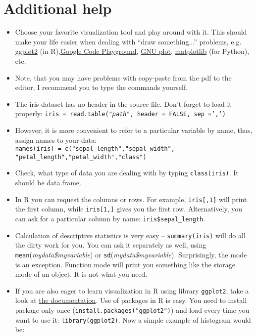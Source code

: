 \documentclass{article}
\begin{document}
\section*{Additional help}
\begin{itemize}
\item Choose your favorite visualization tool and play around with it. This should make your life easier when dealing with ``draw something...'' problems, e.g. \href{http://docs.ggplot2.org/current/}{ggplot2} (in R),\href{https://code.google.com/apis/ajax/playground/?type=visualization#motion_chart}{Google Code Playground}, \href{http://www.gnuplot.info/}{GNU plot}, \href{http://matplotlib.org/}{matplotlib} (for Python), etc.

\item Note, that you may have problems with copy-paste from the pdf to the editor, I recommend you to type the commands yourself. 
\item The iris dataset has no header in the source file. Don't forget to load it properly: \texttt{iris = read.table(\emph{"path"}, header = FALSE, sep =',')}
\item However, it is more convenient to refer to a particular variable by name, thus, assign names to your data:\\
\texttt{names(iris) = c("sepal\_length","sepal\_width",\\"petal\_length","petal\_width","class")} 
\item Check, what type of data you are dealing with by typing \texttt{class(iris)}. It should be data.frame.
\item In R you can request the columns or rows. For example, \texttt{iris[,1]} will print the first column, while \texttt{iris[1,]} gives you the first row. Alternatively, you can ask for a particular column by name: \texttt{iris\$sepal\_length}.
\item Calculation of descriptive statistics is very easy -- \texttt{summary(iris)} will do all the dirty work for you. You can ask it separately as well, using \texttt{mean}(\emph{mydata\$myvariable}) or \texttt{sd}(\emph{mydata\$myvariable}). Surprisingly, the mode is an exception. Function mode will print you something like the storage mode of an object. It is not what you need.
\item If you are also eager to learn  visualization in R using library \texttt{ggplot2}, take a look at \href{http://docs.ggplot2.org/current/}{the documentation}. Use of packages in R is easy. You need to install package only once (\texttt{install.packages("ggplot2")}) and load every time you want to use it: \texttt{library(ggplot2)}. Now a simple example of histogram would be:

\end{itemize}
\end{document}

